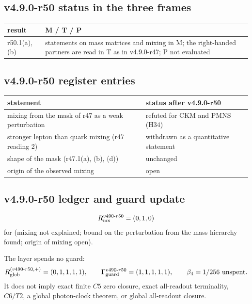 \subsection*{v4.9.0-r50 status in the three frames}
\label{subsec:v490-r50-frames}

\begin{center}
\small
\begin{tabular}{@{}>{\raggedright\arraybackslash}p{}>{\raggedright\arraybackslash}p{}@{}}
\toprule
result & M / T / P\\
\midrule
r50.1(a), (b) & statements on mass matrices and mixing in M; the right-handed partners are read in T as in v4.9.0-r47; P not evaluated\\
\bottomrule
\end{tabular}
\end{center}

\subsection*{v4.9.0-r50 register entries}
\label{subsec:v490-r50-register}

\begin{center}
\small
\begin{tabular}{@{}>{\raggedright\arraybackslash}p{}>{\raggedright\arraybackslash}p{}@{}}
\toprule
statement & status after v4.9.0-r50\\
\midrule
mixing from the mask of r47 as a weak perturbation & refuted for CKM and PMNS (H34)\\
stronger lepton than quark mixing (r47 reading 2) & withdrawn as a quantitative statement\\
shape of the mask (r47.1(a), (b), (d)) & unchanged\\
origin of the observed mixing & open\\
\bottomrule
\end{tabular}
\end{center}

\subsection*{v4.9.0-r50 ledger and guard update}
\label{subsec:v490-r50-ledger-guard}

\[
R_{\rm mx}^{v490\text{-}r50}=(0,1,0)
\]
for (mixing not explained; bound on the perturbation from the mass hierarchy found; origin of mixing open).

The layer spends no guard:
\[
R_{\rm glob}^{(v490\text{-}r50,+)}=(0,1,1,1,1),
\qquad
\Gamma_{\rm guard}^{v490\text{-}r50}=(1,1,1,1,1),
\qquad
\beta_4=1/256\ \text{unspent}.
\]
It does not imply exact finite \(C5\) zero closure, exact all-readout terminality,
\(C6/T2\), a global photon-clock theorem, or global all-readout closure.

